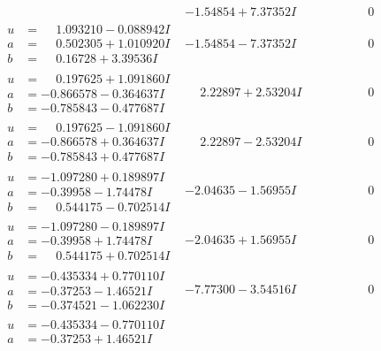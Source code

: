 \documentclass[1p]{elsarticle_modified}
\theoremstyle{definition}
\begin{document}
$$\begin{array}{c|c|c}
 & -1.54854 + 7.37352 I & \phantom{-0.000000 } 0 \\ \hline\begin{aligned}
u &= \phantom{-}1.093210 - 0.088942 I \\
a &= \phantom{-}0.502305 + 1.010920 I \\
b &= \phantom{-}0.16728 + 3.39536 I\end{aligned}
 & -1.54854 - 7.37352 I & \phantom{-0.000000 } 0 \\ \hline\begin{aligned}
u &= \phantom{-}0.197625 + 1.091860 I \\
a &= -0.866578 - 0.364637 I \\
b &= -0.785843 - 0.477687 I\end{aligned}
 & \phantom{-}2.22897 + 2.53204 I & \phantom{-0.000000 } 0 \\ \hline\begin{aligned}
u &= \phantom{-}0.197625 - 1.091860 I \\
a &= -0.866578 + 0.364637 I \\
b &= -0.785843 + 0.477687 I\end{aligned}
 & \phantom{-}2.22897 - 2.53204 I & \phantom{-0.000000 } 0 \\ \hline\begin{aligned}
u &= -1.097280 + 0.189897 I \\
a &= -0.39958 - 1.74478 I \\
b &= \phantom{-}0.544175 - 0.702514 I\end{aligned}
 & -2.04635 - 1.56955 I & \phantom{-0.000000 } 0 \\ \hline\begin{aligned}
u &= -1.097280 - 0.189897 I \\
a &= -0.39958 + 1.74478 I \\
b &= \phantom{-}0.544175 + 0.702514 I\end{aligned}
 & -2.04635 + 1.56955 I & \phantom{-0.000000 } 0 \\ \hline\begin{aligned}
u &= -0.435334 + 0.770110 I \\
a &= -0.37253 - 1.46521 I \\
b &= -0.374521 - 1.062230 I\end{aligned}
 & -7.77300 - 3.54516 I & \phantom{-0.000000 } 0 \\ \hline\begin{aligned}
u &= -0.435334 - 0.770110 I \\
a &= -0.37253 + 1.46521 I \\

\end{aligned}
\end{array}$$
\end{document}
